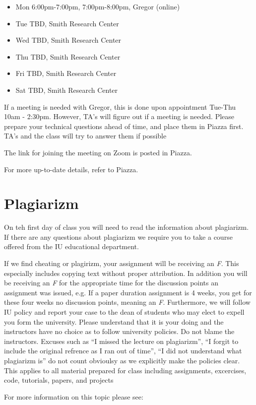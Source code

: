 \begin{itemize}
\item Mon 6:00pm-7:00pm, 7:00pm-8:00pm, Gregor (online)
\item Tue TBD, Smith Research Center
\item Wed TBD, Smith Research Center
\item Thu TBD, Smith Research Center
\item Fri TBD, Smith Research Center
\item Sat TBD, Smith Research Center
\end{itemize}


If a meeting is needed with Gregor, this is done upon appointment
Tue-Thu 10am - 2:30pm. However, TA's will figure out if a meeting is needed.
Please prepare your technical questions ahead of time, and place them in Piazza
first. TA's and the class will try to answer them if possible

The link for joining the meeting on Zoom is posted in Piazza.



For more up-to-date details, refer to Piazza.

\section{Plagiarizm}

On teh first day of class you will need to read the information about
plagiarizm. If there are any questions about plagiarizm we require you
to take a course offered from the IU educational department.

\begin{WARNING}
  If we find cheating or plagirizm, your assignment will be receiving
  an {\em F}. This especially includes copying text without proper
  attribution. In addition you will be receiving an {\em F} for the
  appropriate time for the discussion points an assignment was issued,
  e.g. If a paper duration assignment is 4 weeks, you get for these
  four weeks no discussion points, meaning an {\em F}. Furthermore, we
  will follow IU policy and report your case to the dean of students
  who may elect to expell you form the university. Please understand
  that it is your doing and the instructors have no choice as to
  follow university policies. Do not blame the instructors. Excuses
  such as ``I missed the lecture on plagiarizm'', ``I forgit to
  include the original refrence as I ran out of time'', ``I did not
  understand what plagiarizm is'' do not count obvioulsy as we
  explicitly make the policies clear. This applies to all material
  prepared for class including assignments, excercises, code,
  tutorials, papers, and projects
\end{WARNING}

For more information on this topic please see:

